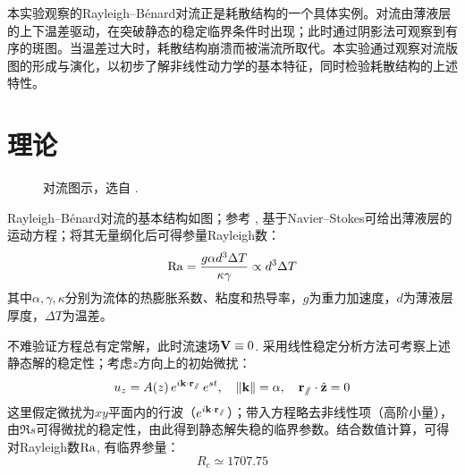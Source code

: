 \documentclass[aps,pre,12pt,preprint,%
	onecolumn,showpacs,showkeys,nofootinbib]{revtex4-1}
\newcommand{\rayleighNumber}{\mrm{Ra}}
\begin{document}
	本实验观察的Rayleigh–Bénard对流正是耗散结构的一个具体实例。对流由薄液层的上下温差驱动，在突破静态的稳定临界条件时出现；此时通过阴影法可观察到有序的斑图。当温差过大时，耗散结构崩溃而被湍流所取代。本实验通过观察对流版图的形成与演化，以初步了解非线性动力学的基本特征，同时检验耗散结构的上述特性。
\clearpage
\section{理论}
\vspace{-1\baselineskip}
\setlength{\jot}{0pt}
	\begin{figure}[!ht]
		\centering
		
		\par\vspace{.5\baselineskip}
		\caption[Rayleigh–Bénard对流图示]{%
			对流图示，选自 \cite{wiki:convection}. %
		}
		\label{fig:convectionSketch}
	\end{figure}
	
	Rayleigh–Bénard对流的基本结构如图；参考 \cite{textbook}, 基于Navier–Stokes可给出薄液层的运动方程；将其无量纲化后可得参量Rayleigh数：
	\begin{equation}
		\rayleighNumber
		= \frac{g\alpha d^3\Delta T}{\kappa\gamma}
		\propto d^3\Delta T
	\end{equation}
	其中$\alpha,\gamma,\kappa$分别为流体的热膨胀系数、粘度和热导率，$g$为重力加速度，$d$为薄液层厚度，$\Delta T$为温差。
	
	不难验证方程总有定常解，此时流速场$\vb{V}\equiv 0$. 采用线性稳定分析方法可考察上述静态解的稳定性；考虑$z$方向上的初始微扰：
	\begin{equation}
		u_z = A(z)\,e^{i\vb{k}\cdot\vb{r}_{\sslash}}\,e^{st},\quad
		\norm{\vb{k}} = \alpha,\quad
		\vb{r}_{\sslash} \cdot \hat{\vb{z}} = 0
	\end{equation}
	这里假定微扰为$xy$平面内的行波（$e^{i\vb{k}\cdot\vb{r}_{\sslash}}$）；带入方程略去非线性项（高阶小量），由$\Re s$可得微扰的稳定性，由此得到静态解失稳的临界参数。结合数值计算，可得对Rayleigh数$\rayleighNumber$, 有临界参量：
	\begin{equation}
		R_c \simeq 1707.75
	\end{equation}
	
\end{document}
